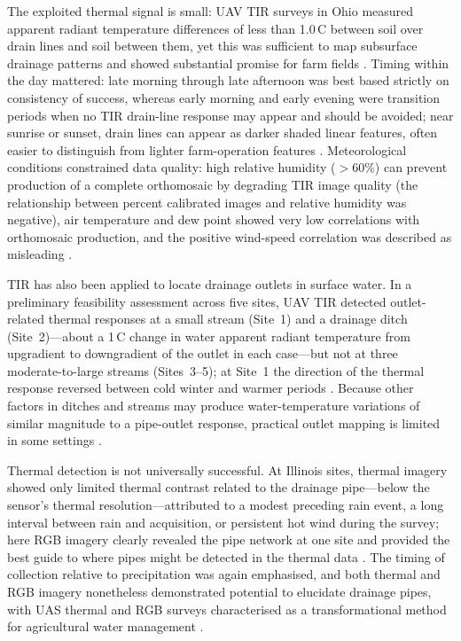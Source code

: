 \documentclass[11pt]{article}
\begin{document}
The exploited thermal signal is small: UAV TIR surveys in Ohio measured apparent radiant temperature differences of less than 1.0\,\textdegree C between soil over drain lines and soil between them, yet this was sufficient to map subsurface drainage patterns and showed substantial promise for farm fields \parencite{Allred2021}. Timing within the day mattered: late morning through late afternoon was best based strictly on consistency of success, whereas early morning and early evening were transition periods when no TIR drain-line response may appear and should be avoided; near sunrise or sunset, drain lines can appear as darker shaded linear features, often easier to distinguish from lighter farm-operation features \parencite{Allred2021}. Meteorological conditions constrained data quality: high relative humidity ($>$60\%) can prevent production of a complete orthomosaic by degrading TIR image quality (the relationship between percent calibrated images and relative humidity was negative), air temperature and dew point showed very low correlations with orthomosaic production, and the positive wind-speed correlation was described as misleading \parencite{Allred2021}.

TIR has also been applied to locate drainage outlets in surface water. In a preliminary feasibility assessment across five sites, UAV TIR detected outlet-related thermal responses at a small stream (Site~1) and a drainage ditch (Site~2)---about a 1\,\textdegree C change in water apparent radiant temperature from upgradient to downgradient of the outlet in each case---but not at three moderate-to-large streams (Sites~3--5); at Site~1 the direction of the thermal response reversed between cold winter and warmer periods \parencite{Allred2022}. Because other factors in ditches and streams may produce water-temperature variations of similar magnitude to a pipe-outlet response, practical outlet mapping is limited in some settings \parencite{Allred2022}.

Thermal detection is not universally successful. At Illinois sites, thermal imagery showed only limited thermal contrast related to the drainage pipe---below the sensor's thermal resolution---attributed to a modest preceding rain event, a long interval between rain and acquisition, or persistent hot wind during the survey; here RGB imagery clearly revealed the pipe network at one site and provided the best guide to where pipes might be detected in the thermal data \parencite{Kratt2020}. The timing of collection relative to precipitation was again emphasised, and both thermal and RGB imagery nonetheless demonstrated potential to elucidate drainage pipes, with UAS thermal and RGB surveys characterised as a transformational method for agricultural water management \parencite{Kratt2020}.
\end{document}
